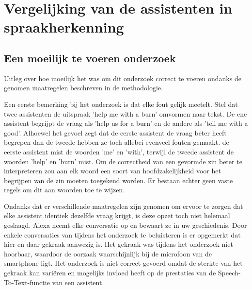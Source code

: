 \section{Vergelijking van de assistenten in spraakherkenning}
\subsection{Een moeilijk te voeren onderzoek}
Uitleg over hoe moeilijk het was om dit onderzoek correct te voeren ondanks de genomen maatregelen beschreven in de methodologie.

Een eerste bemerking bij het onderzoek is dat elke fout gelijk meetelt. Stel dat twee assistenten de uitspraak 'help me with a burn' omvormen naar tekst. De ene assistent begrijpt de vraag als 'help us for a burn' en de andere als 'tell me with a good'. Alhoewel het gevoel zegt dat de eerste assistent de vraag beter heeft begrepen dan de tweede hebben ze toch allebei evenveel fouten gemaakt. de eerste assistent mist de woorden 'me' en 'with', terwijl de tweede assistent de woorden 'help' en 'burn' mist. Om de correctheid van een gevormde zin beter te interpreteren zou aan elk woord een soort van hoofdzakelijkheid voor het begrijpen van de zin moeten toegekend worden. Er bestaan echter geen vaste regels om dit aan woorden toe te wijzen.

Ondanks dat er verschillende maatregelen zijn genomen om ervoor te zorgen dat elke assistent identiek dezelfde vraag krijgt, is deze opzet toch niet helemaal geslaagd. Alexa neemt elke conversatie op en bewaart ze in uw geschiedenis. Door enkele conversaties van tijdens het onderzoek te beluisteren is er opgemerkt dat hier en daar gekraak aanwezig is. Het gekraak was tijdens het onderzoek niet hoorbaar, waardoor de oorzaak waarschijnlijk bij de microfoon van de smartphone ligt. Het onderzoek is niet correct gevoerd omdat de sterkte van het gekraak kan variëren en mogelijks invloed heeft op de prestaties van de Speech-To-Text-functie van een assistent.

